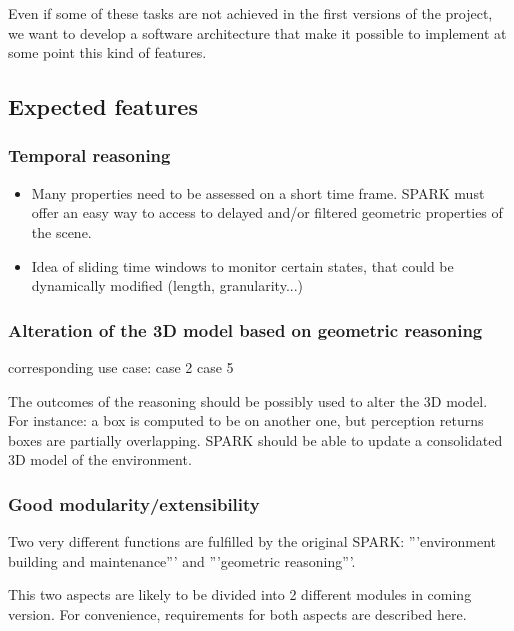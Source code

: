 \documentclass[a4paper]{article}
\begin{document}
Even if some of these tasks are not achieved in the first versions of the
project, we want to develop a software architecture that make it possible to
implement at some point this kind of features.

\subsection{Expected features}

\subsubsection{Temporal reasoning}

\begin{itemize}
    \item Many properties need to be assessed on a short time frame.
        SPARK must offer an easy way to access to delayed and/or
        filtered geometric properties of the scene.

    \item Idea of sliding time windows to monitor certain states, that
        could be dynamically modified (length, granularity...) 

\end{itemize}

\subsubsection{Alteration of the 3D model based on geometric reasoning}

corresponding use case: case 2 case 5

The outcomes of the reasoning should be possibly used to alter the 3D
model. For instance: a box is computed to be on another one, but perception
returns boxes are partially overlapping. SPARK should be able to update a
consolidated 3D model of the environment. 

\subsubsection{Good modularity/extensibility}

Two very different functions are fulfilled by the original SPARK: '''environment building and maintenance''' and '''geometric reasoning'''.

This two aspects are likely to be divided into 2 different modules in coming version. For convenience, requirements for both aspects are described here.
\end{document}
